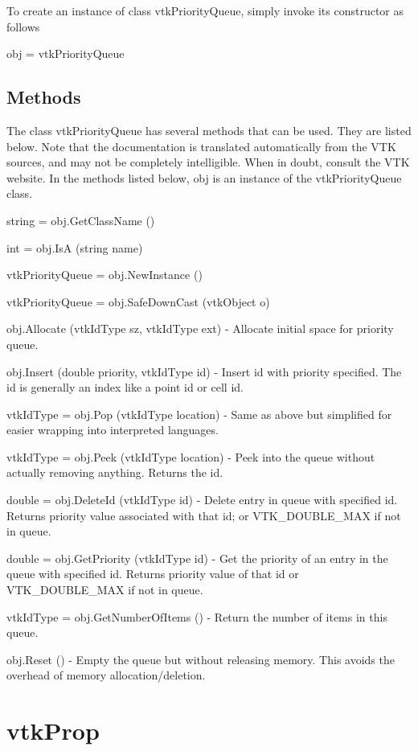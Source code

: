 To create an instance of class vtk\-Priority\-Queue, simply invoke its constructor as follows \begin{DoxyVerb}  obj = vtkPriorityQueue
\end{DoxyVerb}
 \hypertarget{vtkwidgets_vtkxyplotwidget_Methods}{}\subsection{Methods}\label{vtkwidgets_vtkxyplotwidget_Methods}
The class vtk\-Priority\-Queue has several methods that can be used. They are listed below. Note that the documentation is translated automatically from the V\-T\-K sources, and may not be completely intelligible. When in doubt, consult the V\-T\-K website. In the methods listed below, {\ttfamily obj} is an instance of the vtk\-Priority\-Queue class. 
\begin{DoxyItemize}
\item {\ttfamily string = obj.\-Get\-Class\-Name ()}  
\item {\ttfamily int = obj.\-Is\-A (string name)}  
\item {\ttfamily vtk\-Priority\-Queue = obj.\-New\-Instance ()}  
\item {\ttfamily vtk\-Priority\-Queue = obj.\-Safe\-Down\-Cast (vtk\-Object o)}  
\item {\ttfamily obj.\-Allocate (vtk\-Id\-Type sz, vtk\-Id\-Type ext)} -\/ Allocate initial space for priority queue.  
\item {\ttfamily obj.\-Insert (double priority, vtk\-Id\-Type id)} -\/ Insert id with priority specified. The id is generally an index like a point id or cell id.  
\item {\ttfamily vtk\-Id\-Type = obj.\-Pop (vtk\-Id\-Type location)} -\/ Same as above but simplified for easier wrapping into interpreted languages.  
\item {\ttfamily vtk\-Id\-Type = obj.\-Peek (vtk\-Id\-Type location)} -\/ Peek into the queue without actually removing anything. Returns the id.  
\item {\ttfamily double = obj.\-Delete\-Id (vtk\-Id\-Type id)} -\/ Delete entry in queue with specified id. Returns priority value associated with that id; or V\-T\-K\-\_\-\-D\-O\-U\-B\-L\-E\-\_\-\-M\-A\-X if not in queue.  
\item {\ttfamily double = obj.\-Get\-Priority (vtk\-Id\-Type id)} -\/ Get the priority of an entry in the queue with specified id. Returns priority value of that id or V\-T\-K\-\_\-\-D\-O\-U\-B\-L\-E\-\_\-\-M\-A\-X if not in queue.  
\item {\ttfamily vtk\-Id\-Type = obj.\-Get\-Number\-Of\-Items ()} -\/ Return the number of items in this queue.  
\item {\ttfamily obj.\-Reset ()} -\/ Empty the queue but without releasing memory. This avoids the overhead of memory allocation/deletion.  
\end{DoxyItemize}\hypertarget{vtkcommon_vtkprop}{}\section{vtk\-Prop}\label{vtkcommon_vtkprop}
